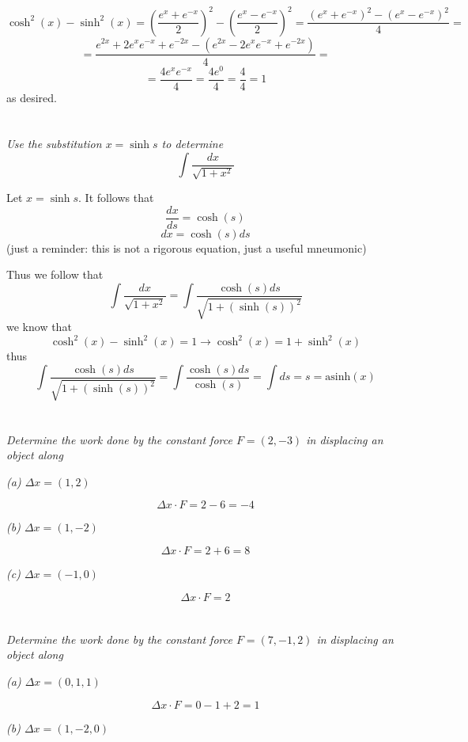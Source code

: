 \documentclass[11pt,oneside,titlepage]{book}
\begin{document}
$$\cosh^2(x) - \sinh^2(x) = \left(\frac{e^x + e^{-x}}{2} \right)^2 -
\left(\frac{e^x - e^{-x}}{2} \right)^2 = 
\frac{(e^x + e^{-x})^2 - (e^x - e^{-x})^2}{4} = 
$$
$$ =
\frac{e^{2x} + 2e^xe^{-x} + e^{-2x} - (e^{2x} - 2e^xe^{-x} + e^{-2x})}{4} =
$$
$$ =
\frac{4e^xe^{-x}}{4} = \frac{4e^0}{4} = \frac{4}{4} = 1
$$
as desired.

\section{}

\textit{Use the substitution $x = \sinh s$ to determine }
$$\int{\frac{dx}{\sqrt{1 + x^2}}}$$

Let $x = \sinh s$. It follows that
$$\frac{dx}{ds} = \cosh(s)$$
$$dx = \cosh(s) ds$$
(just a reminder: this is not a  rigorous equation, just a useful mneumonic)

Thus we follow that
$$\int{\frac{dx}{\sqrt{1 + x^2}}}
= \int{\frac{\cosh(s) ds}{\sqrt{1 + (\sinh( s))^2}}}
$$
we know that 
$$\cosh^2 (x) - \sinh^2(x) = 1 \to \cosh^2 (x) = 1 + \sinh^2(x)$$
thus
$$\int{\frac{\cosh(s) ds}{\sqrt{1 + (\sinh( s))^2}}} =
\int{\frac{\cosh(s) ds}{\cosh(s)}} = \int{ds} = s = \text{asinh}(x)$$

\section{}

\textit{Determine the work done by the constant force $F = (2, -3)$ in displacing an
  object along}

\textit{(a) $\Delta x = (1, 2)$}

$$\Delta x \cdot F = 2 - 6 = -4$$

\textit{(b) $\Delta x = (1, -2)$}

$$\Delta x \cdot F = 2 + 6 = 8$$

\textit{(c) $\Delta x = (-1, 0)$}

$$\Delta x \cdot F = 2 $$

\section{}

\textit{Determine the work done by the constant force $F = (7, -1, 2)$ in displacing an
  object along}

\textit{(a) $\Delta x = (0, 1, 1)$}

$$\Delta x \cdot F = 0 - 1 + 2 = 1 $$

\textit{(b) $\Delta x = (1, -2, 0)$}
\end{document}
